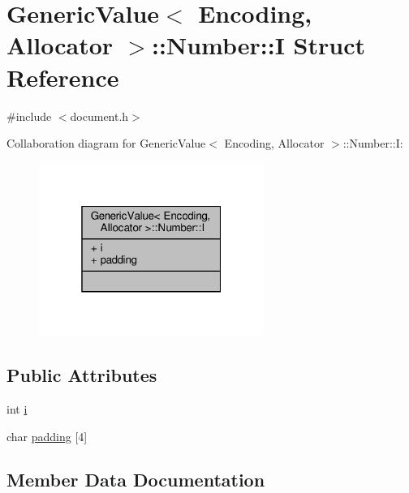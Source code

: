 \hypertarget{structGenericValue_1_1Number_1_1I}{}\section{Generic\+Value$<$ Encoding, Allocator $>$\+:\+:Number\+:\+:I Struct Reference}
\label{structGenericValue_1_1Number_1_1I}


{\ttfamily \#include $<$document.\+h$>$}



Collaboration diagram for Generic\+Value$<$ Encoding, Allocator $>$\+:\+:Number\+:\+:I\+:
\nopagebreak
\begin{figure}[H]
\begin{center}
\leavevmode
\includegraphics[width=208pt]{structGenericValue_1_1Number_1_1I__coll__graph}
\end{center}
\end{figure}
\subsection*{Public Attributes}
\begin{DoxyCompactItemize}
\item 
int \hyperlink{structGenericValue_1_1Number_1_1I_ae0b250dc448d284cf9019f3932bfc380}{i}
\item 
char \hyperlink{structGenericValue_1_1Number_1_1I_aefc064997f30c9c0b2bdce187d1d4cce}{padding} \mbox{[}4\mbox{]}
\end{DoxyCompactItemize}


\subsection{Member Data Documentation}
\mbox{\label{structGenericValue_1_1Number_1_1I_ae0b250dc448d284cf9019f3932bfc380}} 
